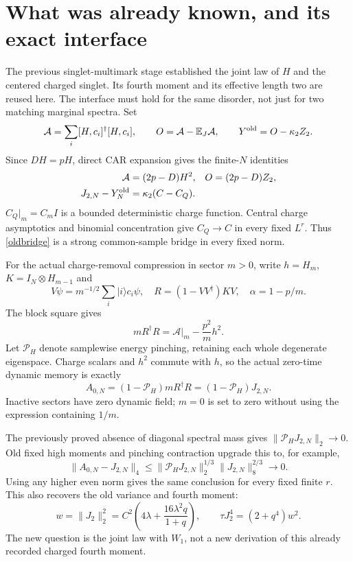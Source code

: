 \documentclass[11pt]{article}
\newcommand{\EE}{\mathbb E}
\newcommand{\PP}{\mathcal P_H}
\begin{document}
\newpage
\section{What was already known, and its exact interface}
The previous singlet-multimark stage \cite{Old} established the
joint law of $H$ and the centered charged singlet. Its fourth moment
and its effective length two are reused here. The interface must hold
for the same disorder, not just for two matching marginal spectra.
Set
\begin{equation}
 \mathcal A=\sum_i[H,c_i]^\dagger[H,c_i],\qquad
 O=\mathcal A-\EE_J\mathcal A,\qquad
 Y^{\rm old}=O-\kappa_2Z_2.
\end{equation}
Since $DH=pH$, direct CAR expansion gives the finite-$N$ identities
\begin{align}
 \mathcal A&=(2p-D)H^2,& O&=(2p-D)Z_2,\\
 J_{2,N}-Y_N^{\rm old}&=\kappa_2(C-C_Q).\label{oldbridge}
\end{align}
$C_Q|_m=C_mI$ is a bounded deterministic charge function. Central
charge asymptotics and binomial concentration give $C_Q\to C$ in
every fixed $L^r$. Thus \eqref{oldbridge} is a strong common-sample
bridge in every fixed norm.

For the actual charge-removal compression in sector $m>0$, write
$h=H_m$, $K=I_N\otimes H_{m-1}$ and
\begin{equation}
 V\psi=m^{-1/2}\sum_i|i\rangle c_i\psi,\quad
 R=(1-VV^\dagger)KV,\quad \alpha=1-p/m.
\end{equation}
The block square gives
\begin{equation}
 mR^\dagger R=\mathcal A|_m-\frac{p^2}{m}h^2.
\end{equation}
Let $\PP$ denote samplewise energy pinching, retaining each whole
degenerate eigenspace. Charge scalars and $h^2$ commute with $h$, so
the actual zero-time dynamic memory is exactly
\begin{equation}
 \boxed{A_{0,N}=(1-\PP)mR^\dagger R=(1-\PP)J_{2,N}.}\label{A0}
\end{equation}
Inactive sectors have zero dynamic field; $m=0$ is set to zero
without using the expression containing $1/m$.

The previously proved absence of diagonal spectral mass gives
$\|\PP J_{2,N}\|_2\to0$. Old fixed high moments and pinching
contraction upgrade this to, for example,
\begin{equation}
 \|A_{0,N}-J_{2,N}\|_4
 \le\|\PP J_{2,N}\|_2^{1/3}\|J_{2,N}\|_8^{2/3}\longrightarrow0.
\end{equation}
Using any higher even norm gives the same conclusion for every
fixed finite $r$. This also recovers the old variance and fourth moment:
\begin{equation}
 w=\|J_2\|_2^2=C^2\left(4\lambda+
              \frac{16\lambda^2q}{1+q}\right),\qquad
 \tau J_2^4=(2+q^4)w^2.
\end{equation}
The new question is the joint law with $W_1$, not a new derivation
of this already recorded charged fourth moment.
\end{document}
